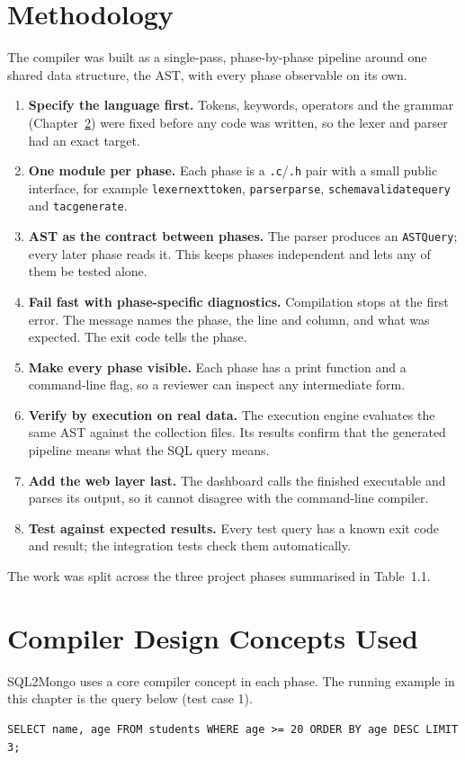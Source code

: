 \documentclass[12pt,a4paper]{report}
\newcommand{\codeus}{\textunderscore\allowbreak}
\DeclareRobustCommand{\code}[1]{\texttt{\let\_\codeus #1}}
\begin{document}
\chapter{Methodology}
The compiler was built as a single-pass, phase-by-phase pipeline around one shared data structure, the AST, with every phase observable on its own.
\begin{enumerate}
  \item \textbf{Specify the language first.} Tokens, keywords, operators and the grammar (Chapter~\ref{ch:concepts}) were fixed before any code was written, so the lexer and parser had an exact target.
  \item \textbf{One module per phase.} Each phase is a \code{.c}/\code{.h} pair with a small public interface, for example \code{lexer\_next\_token}, \code{parser\_parse}, \code{schema\_validate\_query} and \code{tac\_generate}.
  \item \textbf{AST as the contract between phases.} The parser produces an \code{ASTQuery}; every later phase reads it. This keeps phases independent and lets any of them be tested alone.
  \item \textbf{Fail fast with phase-specific diagnostics.} Compilation stops at the first error. The message names the phase, the line and column, and what was expected. The exit code tells the phase.
  \item \textbf{Make every phase visible.} Each phase has a print function and a command-line flag, so a reviewer can inspect any intermediate form.
  \item \textbf{Verify by execution on real data.} The execution engine evaluates the same AST against the collection files. Its results confirm that the generated pipeline means what the SQL query means.
  \item \textbf{Add the web layer last.} The dashboard calls the finished executable and parses its output, so it cannot disagree with the command-line compiler.
  \item \textbf{Test against expected results.} Every test query has a known exit code and result; the integration tests check them automatically.
\end{enumerate}
The work was split across the three project phases summarised in Table~1.1.

\chapter{Compiler Design Concepts Used}\label{ch:concepts}
SQL2Mongo uses a core compiler concept in each phase. The running example in this chapter is the query below (test case 1).
\begin{lstlisting}
SELECT name, age FROM students WHERE age >= 20 ORDER BY age DESC LIMIT 3;
\end{lstlisting}
\end{document}
